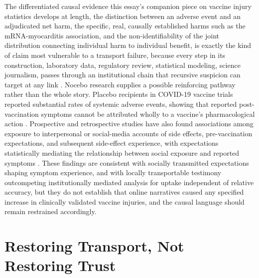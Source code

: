 \documentclass[11pt]{article}
\begin{document}
The differentiated causal evidence this essay's companion piece on vaccine injury statistics develops at length, the distinction between an adverse event and an adjudicated net harm, the specific, real, causally established harms such as the mRNA-myocarditis association, and the non-identifiability of the joint distribution connecting individual harm to individual benefit, is exactly the kind of claim most vulnerable to a transport failure, because every step in its construction, laboratory data, regulatory review, statistical modeling, science journalism, passes through an institutional chain that recursive suspicion can target at any link \citep{nasem2024}. Nocebo research supplies a possible reinforcing pathway rather than the whole story. Placebo recipients in COVID-19 vaccine trials reported substantial rates of systemic adverse events, showing that reported post-vaccination symptoms cannot be attributed wholly to a vaccine's pharmacological action \citep{haas2022}. Prospective and retrospective studies have also found associations among exposure to interpersonal or social-media accounts of side effects, pre-vaccination expectations, and subsequent side-effect experience, with expectations statistically mediating the relationship between social exposure and reported symptoms \citep{tan2022,clemens2023}. These findings are consistent with socially transmitted expectations shaping symptom experience, and with locally transportable testimony outcompeting institutionally mediated analysis for uptake independent of relative accuracy, but they do not establish that online narratives caused any specified increase in clinically validated vaccine injuries, and the causal language should remain restrained accordingly.

\section{Restoring Transport, Not Restoring Trust}
\end{document}
